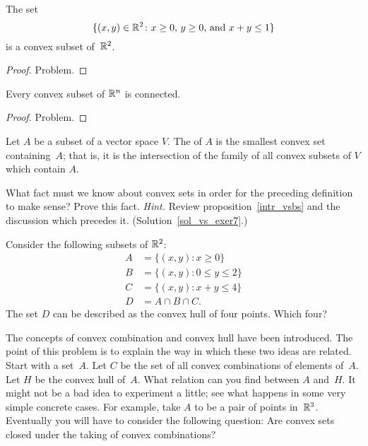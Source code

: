 \begin{exam} The set
  \[ \{(x,y) \in \mathbb{R}^2 \colon  \text{$x \ge 0$, $y \ge 0$, and $x + y \le 1$}\} \]
is a convex subset of~$\mathbb{R}^2$.
\end{exam}

\begin{proof} Problem.  \ns  \end{proof}

\begin{exam} Every convex subset of $\mathbb{R}^n$ is connected.
\end{exam}

\begin{proof} Problem.  \ns  \end{proof}

\begin{defn} Let $A$ be a subset of a vector space $V$.  The
 of $A$ is the smallest convex set containing~$A$; that is, it is the
intersection of the family of all convex subsets of $V$ which contain $A$.
\end{defn}

\begin{exer}\label{vs_exer7} What fact must we know about convex sets in order for the
preceding definition to make sense?  Prove this fact.  \emph{Hint.} Review
proposition~\ref{intr_vsbs} and the discussion which precedes it.
(Solution~\ref{sol_vs_exer7}.)
\end{exer}

\begin{prob} Consider the following subsets of $\mathbb{R}^2$:
 \begin{align*}
        A &= \{(x,y) \colon x \ge 0\} \\
        B &= \{(x,y) \colon 0 \le y \le 2\} \\
        C &= \{(x,y) \colon x + y \le 4\} \\
        D &= A \cap B \cap C.
 \end{align*}
The set $D$ can be described as the convex hull of four points. Which four?
\end{prob}

\begin{prob} The concepts of convex combination and convex hull have been introduced.  The
point of this problem is to explain the way in which these two ideas are related.  Start with
a set~$A$.  Let $C$ be the set of all convex combinations of elements of~$A$.  Let $H$ be the
convex hull of~$A$.  What relation can you find between $A$ and~$H$.  It might not be a bad
idea to experiment a little; see what happens in some very simple concrete cases.  For
example, take $A$ to be a pair of points in~$\mathbb{R}^3$.  Eventually you will have to consider the
following question: Are convex sets closed under the taking of convex combinations?
\end{prob}





\endinput
